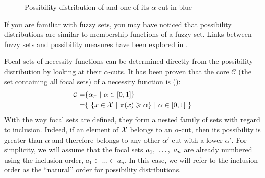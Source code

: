 \begin{figure}[!ht]
    \centering
    \caption{Possibility distribution of  and one of its $\alpha$-cut in blue}
    \label{fig:possibility_distribution}
\end{figure}

\begin{remark}
    If you are familiar with fuzzy sets, you may have noticed that possibility distributions are similar to membership functions of a fuzzy set. Links between fuzzy sets and possibility measures have been explored in \cite{zadeh_fuzzy_1999}.
\end{remark}

Focal sets of necessity functions can be determined directly from the possibility distribution by looking at their \( \alpha \)-cuts. It has been proven that the core $\mathcal{C}$ (the set containing all focal sets) of a necessity function is (\cite{couso_necessity_2001}):
\begin{align*}
    \mathcal{C} =& \{\alpha_\pi~|~\alpha\in[0,1]\}\\
    =& \{ ~\{x\in\mathcal{X}~|~\pi(x)\geqslant\alpha\}~|~\alpha\in[0,1]~\}
\end{align*}
With the way focal sets are defined, they form a nested family of sets with regard to inclusion. Indeed, if an element of \(\mathcal{X}\) belongs to an \(\alpha\)-cut, then its possibility is greater than \(\alpha\) and therefore belongs to any other \(\alpha'\)-cut with a lower \(\alpha'\). For simplicity, we will assume that the focal sets \(a_1, ~\ldots, ~ a_n\) are already numbered using the inclusion order, \ie \( a_1\subset\ldots\subset a_n\). In this case, we will refer to the inclusion order as the ``natural'' order for possibility distributions.

